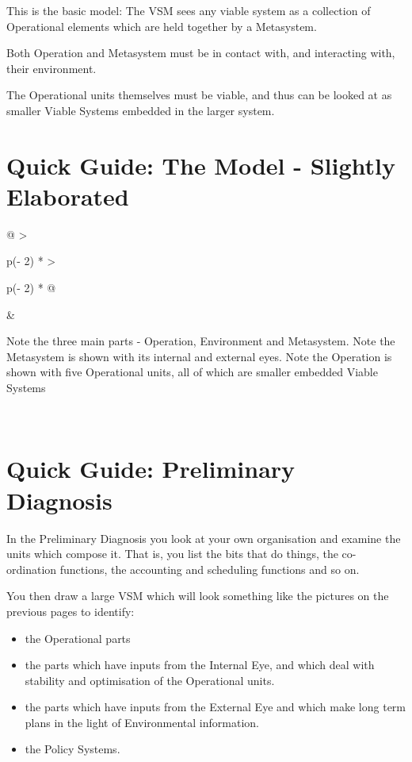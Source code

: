 This is the basic model: The VSM sees any viable system as a collection of Operational elements which are held together by a Metasystem.

Both Operation and Metasystem must be in contact with, and interacting with, their environment.

The Operational units themselves must be viable, and thus can be looked at as smaller Viable Systems embedded in the larger system.

\section*{Quick Guide: The Model - Slightly Elaborated}

\begin{longtable}[]{@{}
        >{\raggedright\arraybackslash}p{(\columnwidth - 2\tabcolsep) * }
        >{\raggedright\arraybackslash}p{(\columnwidth - 2\tabcolsep) * }@{}}
    & \begin{minipage}[c]{\linewidth}\raggedright
       Note the three main parts - Operation, Environment and Metasystem.
       \vspace{\baselineskip}
       Note the Metasystem is shown with its internal and external eyes.
       \vspace{\baselineskip}
       Note the Operation is shown with five Operational units, all of which are smaller embedded Viable Systems
    \end{minipage} \\
\end{longtable}

\section*{Quick Guide: Preliminary Diagnosis}
In the Preliminary Diagnosis you look at your own organisation and examine the units which compose it. That is, you list the bits that do things, the co-ordination functions, the accounting and scheduling functions and so on.

You then draw a large VSM which will look something like the pictures on the previous pages to identify:

\begin{itemize}
  \item the Operational parts

  \item the parts which have inputs from the Internal Eye, and which deal with stability and optimisation of the Operational units.

  \item the parts which have inputs from the External Eye and which make long term plans in the light of Environmental information.

  \item the Policy Systems.

\end{itemize}

